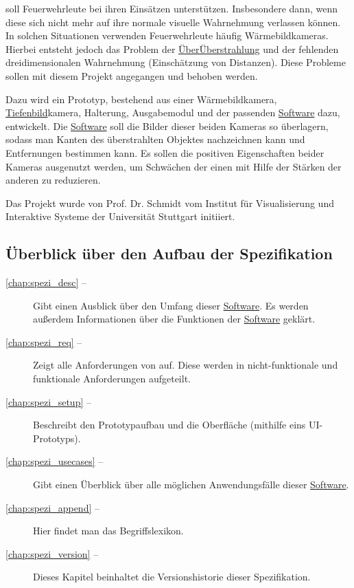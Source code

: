 \profire soll Feuerwehrleute bei ihren Einsätzen unterstützen.
Insbesondere dann, wenn diese sich nicht mehr auf ihre normale visuelle Wahrnehmung verlassen können.
In solchen Situationen verwenden Feuerwehrleute häufig Wärmebildkameras.
Hierbei entsteht jedoch das Problem der \hyperlink{tab:strahlung}{ÜberÜberstrahlung} und der fehlenden dreidimensionalen Wahrnehmung (\va Einschätzung von Distanzen).
Diese Probleme sollen mit diesem Projekt angegangen und behoben werden.

Dazu wird ein Prototyp, bestehend aus einer Wärmebildkamera, \hyperlink{tab:tiefe}{Tiefenbild}kamera, Halterung, Ausgabemodul und der passenden \hyperlink{tab:anwendung}{Software} dazu, entwickelt.
Die \hyperlink{tab:anwendung}{Software} soll die Bilder dieser beiden Kameras so überlagern, sodass man Kanten des überstrahlten Objektes nachzeichnen kann und Entfernungen bestimmen kann.
Es sollen die positiven Eigenschaften beider Kameras ausgenutzt werden, um Schwächen der einen mit Hilfe der Stärken der anderen zu reduzieren.

Das Projekt wurde von Prof. Dr. Schmidt vom Institut für Visualisierung und Interaktive Systeme der Universität Stuttgart initiiert.

\subsection{Überblick über den Aufbau der Spezifikation}
\begin{description}
	\item[\cref{chap:spezi_desc} -- ] Gibt einen Ausblick über den Umfang dieser \hyperlink{tab:anwendung}{Software}. Es werden  außerdem Informationen über die Funktionen der \hyperlink{tab:anwendung}{Software} geklärt.
	\item[\cref{chap:spezi_req} -- ] Zeigt alle Anforderungen von \profire auf. Diese werden in nicht-funktionale und funktionale Anforderungen aufgeteilt.
	\item[\cref{chap:spezi_setup} -- ] Beschreibt den Prototypaufbau und die Oberfläche (mithilfe eins UI-Prototyps).
	\item[\cref{chap:spezi_usecases} -- ] Gibt einen Überblick über alle möglichen Anwendungsfälle dieser \hyperlink{tab:anwendung}{Software}.
	\item[\cref{chap:spezi_append} -- ] Hier findet man das Begriffslexikon.
	\item[\cref{chap:spezi_version} -- ] Dieses Kapitel beinhaltet die Versionshistorie dieser Spezifikation.
\end{description}

